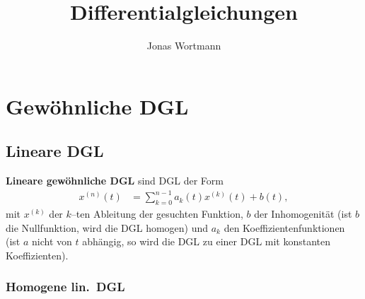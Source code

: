 \documentclass[a4paper,12pt]{article}
\numberwithin{equation}{section}
\begin{document}

\title{Differentialgleichungen}
\author{Jonas Wortmann}
\maketitle
{}


\newpage


\fancyhead[L]{\thepage}
\fancyfoot[C]{}

\tableofcontents


\newpage


\fancyhead[R]{\leftmark\\\rightmark}

\section{Gewöhnliche DGL}
\subsection{Lineare DGL}
\textbf{Lineare gewöhnliche DGL} sind DGL der Form
\begin{align} 
        x^{\left(n\right)}\left(t\right)&=\sum_{k=0}^{n-1}a_k\left(t\right)x^{\left(k\right)}\left(t\right)+b\left(t\right)
,\end{align} 
mit $x^{\left(k\right)}$ der $k$--ten Ableitung der gesuchten Funktion, $b$ der Inhomogenität (ist $b$ die Nullfunktion, wird die DGL homogen) und $a_k$ den Koeffizientenfunktionen (ist $a$ nicht von $t$ abhängig, so wird die DGL zu einer DGL mit konstanten Koeffizienten).

\subsubsection{Homogene lin.\ DGL}
\end{document}
